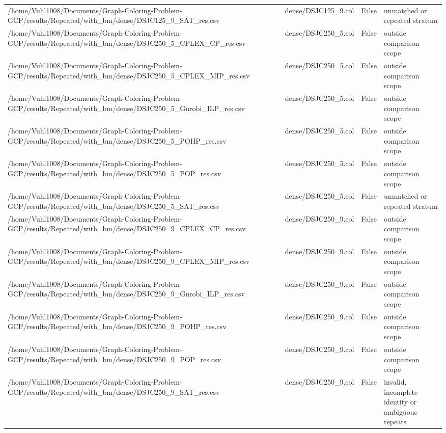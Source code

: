 \begin{table}[htbp]
\begin{tabular}{llll}
/home/Vuhl1008/Documents/Graph-Coloring-Problem-GCP/results/Repeated/with\_bm/dense/DSJC125\_9\_SAT\_res.csv & dense/DSJC125\_9.col & False & unmatched or repeated stratum \\
/home/Vuhl1008/Documents/Graph-Coloring-Problem-GCP/results/Repeated/with\_bm/dense/DSJC250\_5\_CPLEX\_CP\_res.csv & dense/DSJC250\_5.col & False & outside comparison scope \\
/home/Vuhl1008/Documents/Graph-Coloring-Problem-GCP/results/Repeated/with\_bm/dense/DSJC250\_5\_CPLEX\_MIP\_res.csv & dense/DSJC250\_5.col & False & outside comparison scope \\
/home/Vuhl1008/Documents/Graph-Coloring-Problem-GCP/results/Repeated/with\_bm/dense/DSJC250\_5\_Gurobi\_ILP\_res.csv & dense/DSJC250\_5.col & False & outside comparison scope \\
/home/Vuhl1008/Documents/Graph-Coloring-Problem-GCP/results/Repeated/with\_bm/dense/DSJC250\_5\_POHP\_res.csv & dense/DSJC250\_5.col & False & outside comparison scope \\
/home/Vuhl1008/Documents/Graph-Coloring-Problem-GCP/results/Repeated/with\_bm/dense/DSJC250\_5\_POP\_res.csv & dense/DSJC250\_5.col & False & outside comparison scope \\
/home/Vuhl1008/Documents/Graph-Coloring-Problem-GCP/results/Repeated/with\_bm/dense/DSJC250\_5\_SAT\_res.csv & dense/DSJC250\_5.col & False & unmatched or repeated stratum \\
/home/Vuhl1008/Documents/Graph-Coloring-Problem-GCP/results/Repeated/with\_bm/dense/DSJC250\_9\_CPLEX\_CP\_res.csv & dense/DSJC250\_9.col & False & outside comparison scope \\
/home/Vuhl1008/Documents/Graph-Coloring-Problem-GCP/results/Repeated/with\_bm/dense/DSJC250\_9\_CPLEX\_MIP\_res.csv & dense/DSJC250\_9.col & False & outside comparison scope \\
/home/Vuhl1008/Documents/Graph-Coloring-Problem-GCP/results/Repeated/with\_bm/dense/DSJC250\_9\_Gurobi\_ILP\_res.csv & dense/DSJC250\_9.col & False & outside comparison scope \\
/home/Vuhl1008/Documents/Graph-Coloring-Problem-GCP/results/Repeated/with\_bm/dense/DSJC250\_9\_POHP\_res.csv & dense/DSJC250\_9.col & False & outside comparison scope \\
/home/Vuhl1008/Documents/Graph-Coloring-Problem-GCP/results/Repeated/with\_bm/dense/DSJC250\_9\_POP\_res.csv & dense/DSJC250\_9.col & False & outside comparison scope \\
/home/Vuhl1008/Documents/Graph-Coloring-Problem-GCP/results/Repeated/with\_bm/dense/DSJC250\_9\_SAT\_res.csv & dense/DSJC250\_9.col & False & invalid, incomplete identity or ambiguous repeats \\

\end{tabular}
\end{table}

